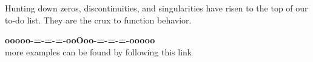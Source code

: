 \documentclass{ximera}
\begin{document}
Hunting down zeros, discontinuities, and singularities have risen to the top of our to-do list.  They are the crux to function behavior. 














\begin{center}
\textbf{\textcolor{green!50!black}{ooooo-=-=-=-ooOoo-=-=-=-ooooo}} \\

more examples can be found by following this link\\ 

\end{center}
\end{document}

